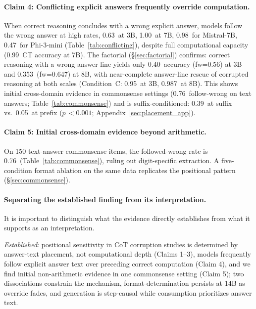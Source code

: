 \documentclass{article}
\theoremstyle{definition}
\theoremstyle{definition}
\newcommand{\CCFW}{0.63}
\newcommand{\PHICCFW}{0.47}
\newcommand{\CSCCFW}{0.76}
\newcommand{\FSCB}{0.56}
\newcommand{\FSCC}{0.95}
\newcommand{\FSCBACC}{0.40}
\newcommand{\FSeightCB}{0.647}
\newcommand{\FSeightCC}{0.987}
\newcommand{\FSeightCBacc}{0.353}
\newcommand{\SBCCFW}{1.00}
\newcommand{\SBCTACC}{0.99}
\newcommand{\MISTCCFW}{0.98}
\newcommand{\CPFWPRE}{0.05}
\newcommand{\CPFWSUF}{0.39}
\newcommand{\CPSUFPREPVAL}{< 0.001}
\begin{document}
\paragraph{Claim 4: Conflicting explicit answers frequently override computation.}
When correct reasoning concludes with a wrong explicit answer,
models follow the wrong answer at high rates, \CCFW\ at 3B,
\SBCCFW\ at 7B, \MISTCCFW\ for Mistral-7B, \PHICCFW\ for Phi-3-mini
(Table~\ref{tab:conflicting}), despite full computational
capacity (\SBCTACC\ CT accuracy at 7B).
The factorial (\S\ref{sec:factorial}) confirms: correct reasoning with
a wrong answer line yields only \FSCBACC\ accuracy (fw=\FSCB) at 3B
and \FSeightCBacc\ (fw=\FSeightCB) at 8B, with near-complete answer-line
rescue of corrupted reasoning at both scales (Condition~C: \FSCC\ at 3B, \FSeightCC\ at 8B).
This shows initial cross-domain evidence in commonsense settings
(\CSCCFW\ follow-wrong on text answers; Table~\ref{tab:commonsense}) and is
suffix-conditioned: \CPFWSUF\ at suffix vs.\ \CPFWPRE\ at prefix
($p\,\CPSUFPREPVAL$; Appendix~\ref{sec:placement_app}).

\paragraph{Claim 5: Initial cross-domain evidence beyond arithmetic.}
On 150 text-answer commonsense items, the followed-wrong rate is
\CSCCFW\ (Table~\ref{tab:commonsense}), ruling out digit-specific
extraction. A five-condition format ablation on the same data replicates
the positional pattern (\S\ref{sec:commonsense}).

\paragraph{Separating the established finding from its interpretation.}
It is important to distinguish what the evidence directly establishes from
what it supports as an interpretation.

\emph{Established}: positional
sensitivity in CoT corruption studies is determined by answer-text
placement, not computational depth (Claims 1--3), models frequently
follow explicit answer text over preceding correct computation (Claim 4),
and we find initial non-arithmetic evidence in one commonsense setting (Claim 5); two
dissociations constrain the mechanism, format-determination persists at
14B as override fades, and generation is step-causal while consumption
prioritizes answer text.
\end{document}
